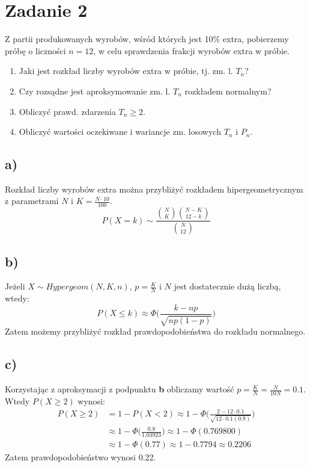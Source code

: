 \documentclass{article}
\begin{document}
\newpage
\section{Zadanie 2}
Z partii produkowanych wyrobów, wśród których jest 10\% extra, pobierzemy próbę o liczności $n=12$, w celu sprawdzenia frakcji wyrobów extra w próbie.
\begin{enumerate}[label = \alph*)]
\item Jaki jest rozkład liczby wyrobów extra w próbie, tj. zm. l. $T_n$?
\item Czy rozsądne jest aproksymowanie zm. l. $T_n$ rozkładem normalnym?
\item Obliczyć prawd. zdarzenia $T_n \geq 2$.
\item Obliczyć wartości oczekiwane i wariancje zm. losowych $T_n$ i $P_n$.
\end{enumerate}

\subsection*{a)}
Rozkład liczby wyrobów extra można przybliżyć rozkładem hipergeometrycznym z parametrami $N$ i $K=\frac{N\cdot10}{100}$.
\[
P(X=k) \sim \frac{\binom{N}{K}\binom{N-K}{12-k}}{\binom{N}{12}}
\]

\subsection*{b)}
Jeżeli $X \sim Hypergeom(N,K,n)$, $p=\frac{K}{N}$ i $N$ jest dostatecznie dużą liczbą, wtedy:
\[
P(X\leq k) \approx \Phi\Big( \frac{k-np}{\sqrt{np(1-p)}}\Big)
\]
Zatem możemy przybliżyć rozkład prawdopodobieństwa do rozkładu normalnego.

\subsection*{c)}
Korzystając z aproksymacji z podpunktu \textbf{b} obliczamy wartość $p=\frac{K}{N}=\frac{N}{10N}=0.1$. Wtedy $P(X\geq2)$ wynosi:
\begin{align*}
P(X\geq2) & = 1 - P(X<2) \approx 1 - \Phi\Big( \frac{2-12\cdot0.1}{\sqrt{12\cdot0.1(0.9)}} \Big) \\ 
& \approx 1 - \Phi\Big( \frac{0.8}{1.03923}\Big) \approx 1 - \Phi(0.769800) \\
& \approx 1 - \Phi(0.77) \approx 1 - 0.7794 \approx 0.2206
\end{align*}
Zatem prawdopodobieństwo wynosi 0.22.
\end{document}
